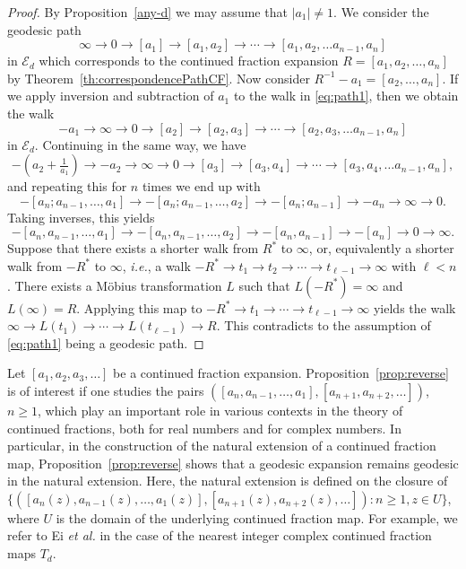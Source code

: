 \documentclass[graybox]{svmult}
\begin{document}
\begin{proof}
By Proposition~\ref{any-d} we may assume that $|a_{1}| \ne 1$. We consider the geodesic path 
\begin{equation}\label{eq:path1}
\infty \to 0 \to [a_1] \to [a_{1},a_2] \to \cdots \to[a_{1},a_{2},\ldots 
a_{n-1},a_{n}]
\end{equation}
in $\mathcal{E}_d$ which corresponds to the continued fraction expansion 
$R = [a_{1},a_{2},\ldots,a_{n}]$ by Theorem~\ref{th:correspondencePathCF}.
Now consider $R^{-1}-a_1= [a_{2},\ldots,a_{n}]$. If we apply inversion and subtraction of $a_1$ to the walk in \eqref{eq:path1}, then we obtain the walk
\[
-a_{1} \to \infty \to 0 \to [a_2] \to [a_{2},a_{3}] \to \cdots \to[a_{2},a_{3},\ldots 
a_{n-1},a_{n}]
\]
in $\mathcal{E}_d$. Continuing in the same way, we have 
\[
-\left( a_{2}  + \tfrac{1}{a_{1}}\right) \to -a_{2} \to \infty \to 0  \to [a_3] \to [a_{3},a_{4}] \to \cdots \to[a_{3},a_{4},\ldots 
a_{n-1},a_{n}],
\] 
and repeating this for $n$ times we end up with 
\[
-[a_n;a_{n-1},\ldots, a_1] \to -[a_n;a_{n-1},\ldots, a_2] \to -[a_n;a_{n-1}] \to -a_n \to \infty \to 0.
\]
Taking inverses, this yields 
\[
-[a_n,a_{n-1},\ldots, a_1] \to -[a_n,a_{n-1},\ldots, a_2] \to -[a_n,a_{n-1}] \to -[a_n] \to 0 \to \infty.
\]
Suppose that there exists a shorter walk from $R^{*}$ to $\infty$, or, equivalently a shorter walk from $-R^{*}$ to $\infty$, {\it i.e.}, a walk $-R^{*} \to t_{1} \to t_{2} \to \cdots \to t_{\ell-1} \to \infty$ with $\ell < n$.  There exists a M\"obius transformation $L$ such that $L(-R^{*})= \infty$ and $L(\infty)=R$. Applying this map to $-R^{*} \to t_{1} \to \cdots \to t_{\ell-1} \to \infty$ yields the walk $\infty \to L(t_{1}) \to \cdots \to L(t_{\ell-1}) \to R$. This contradicts to the assumption of \eqref{eq:path1} being a geodesic path.
\end{proof}

Let $[a_1,a_2,a_3,\ldots]$ be a continued fraction expansion. Proposition~\ref{prop:reverse} is of interest if one studies the pairs 
$([a_{n}, a_{n-1}, \ldots, a_{1}], [a_{n+1}, a_{n+2}, \ldots])$, $n\ge 1$,
which play an important role in various contexts in the theory of continued fractions, both for real numbers and for complex numbers.  In particular, in the construction of the natural extension of a continued fraction map, Proposition~\ref{prop:reverse} shows that a geodesic expansion remains geodesic in the natural extension. Here, the natural extension is defined on the closure of $\{([a_{n}(z), a_{n-1}(z), \ldots, a_{1}(z)], [a_{n+1}(z), a_{n+2}(z), \ldots]) : n \ge 1, z \in U\}$, where $U$ is the domain of the underlying continued fraction map. For example, we refer to  Ei {\em et al.} \cite{E-N-N} in the case of the nearest integer complex continued fraction maps $T_d$.
\end{document}
